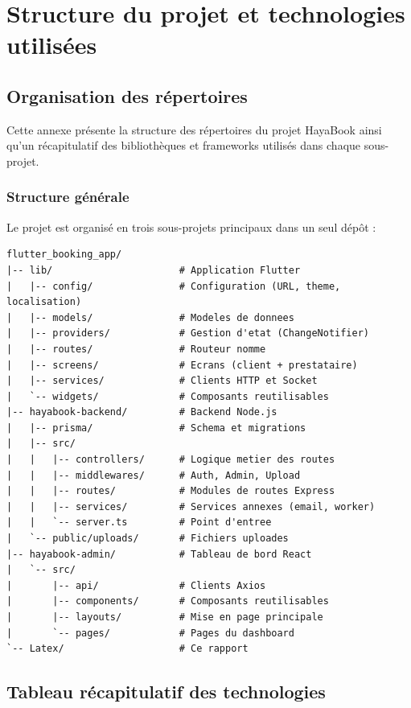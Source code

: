 \chapter{Structure du projet et technologies utilisées}

\section{Organisation des répertoires}

Cette annexe présente la structure des répertoires du projet HayaBook ainsi qu'un récapitulatif des bibliothèques et frameworks utilisés dans chaque sous-projet.

\subsection{Structure générale}

Le projet est organisé en trois sous-projets principaux dans un seul dépôt :

\begin{lstlisting}[caption={Arborescence générale du projet HayaBook}]
flutter_booking_app/
|-- lib/                      # Application Flutter
|   |-- config/               # Configuration (URL, theme, localisation)
|   |-- models/               # Modeles de donnees
|   |-- providers/            # Gestion d'etat (ChangeNotifier)
|   |-- routes/               # Routeur nomme
|   |-- screens/              # Ecrans (client + prestataire)
|   |-- services/             # Clients HTTP et Socket
|   `-- widgets/              # Composants reutilisables
|-- hayabook-backend/         # Backend Node.js
|   |-- prisma/               # Schema et migrations
|   |-- src/
|   |   |-- controllers/      # Logique metier des routes
|   |   |-- middlewares/      # Auth, Admin, Upload
|   |   |-- routes/           # Modules de routes Express
|   |   |-- services/         # Services annexes (email, worker)
|   |   `-- server.ts         # Point d'entree
|   `-- public/uploads/       # Fichiers uploades
|-- hayabook-admin/           # Tableau de bord React
|   `-- src/
|       |-- api/              # Clients Axios
|       |-- components/       # Composants reutilisables
|       |-- layouts/          # Mise en page principale
|       `-- pages/            # Pages du dashboard
`-- Latex/                    # Ce rapport
\end{lstlisting}

\section{Tableau récapitulatif des technologies}

